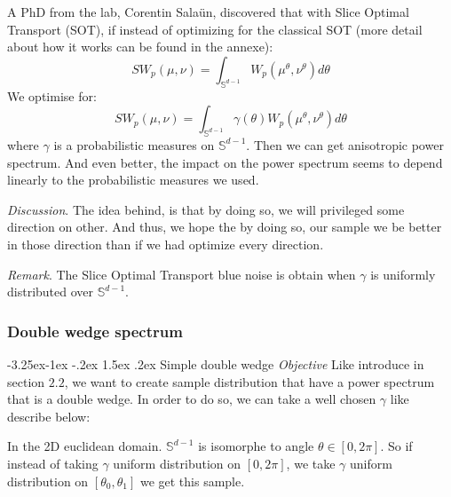 \documentclass{classeENS}
\makeatletter
\newcounter{subsubsubsection}[subsubsection]
\newcommand\subsubsubsection{\@startsection{subsubsubsection}{4}{\z@}%
                                     {-3.25ex\@plus -1ex \@minus -.2ex}%
                                     {1.5ex \@plus .2ex}%
                                     {\normalfont\normalsize\bfseries}}
\makeatother
\begin{document}
\> A PhD from the lab, Corentin Salaün, discovered that with Slice Optimal Transport (SOT), 
if instead of optimizing for the classical SOT (more detail about how it works can be found in the annexe):
\[SW_p(\mu, \nu) = \int_{\mathbb{S}^{d-1}} W_p(\mu^\theta,\nu^\theta) d\theta\]
We optimise for:
\[SW_p(\mu, \nu) = \int_{\mathbb{S}^{d-1}} \gamma(\theta) W_p(\mu^\theta,\nu^\theta) d\theta\]
where $\gamma$ is a probabilistic measures on $\mathbb{S}^{d-1}$. Then we can get anisotropic
power spectrum. And even better, the impact on the power spectrum seems to depend linearly to
the probabilistic measures we used.

\> \textit{Discussion}. The idea behind, is that by doing so, we will privileged some
    direction on other. And thus, we hope the by doing so, our sample we be better in
    those direction than if we had optimize every direction.
    
\> \textit{Remark}. The Slice Optimal Transport blue noise is obtain when 
    $\gamma$ is uniformly distributed over $\mathbb{S}^{d-1}$.

\subsubsection{Double wedge spectrum}

\subsubsubsection{Simple double wedge}
\textit{Objective} Like introduce in section $2.2$, we want to create sample distribution
    that have a power spectrum that is a double wedge. In order to do so, we can take
    a well chosen $\gamma$ like describe below:

In the 2D euclidean domain. $\mathbb{S}^{d-1}$ is isomorphe to angle $\theta \in [0,2\pi]$.
So if instead of taking $\gamma$ uniform distribution on $[0,2\pi]$, we take $\gamma$
uniform distribution on $[\theta_0,\theta_1]$ we get this sample.
\end{document}
